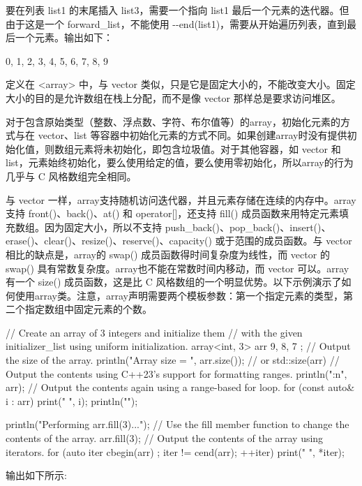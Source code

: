 要在列表 list1 的末尾插入 list3，需要一个指向 list1 最后一个元素的迭代器。但由于这是一个 forward\_list，不能使用 -{}-end(list1)，需要从开始遍历列表，直到最后一个元素。输出如下：

\begin{shell}
0, 1, 2, 3, 4, 5, 6, 7, 8, 9
\end{shell}


定义在 <array> 中，与 vector 类似，只是它是固定大小的，不能改变大小。固定大小的目的是允许数组在栈上分配，而不是像 vector 那样总是要求访问堆区。

对于包含原始类型（整数、浮点数、字符、布尔值等）的array，初始化元素的方式与在 vector、list 等容器中初始化元素的方式不同。如果创建array时没有提供初始化值，则数组元素将未初始化，即包含垃圾值。对于其他容器，如 vector 和 list，元素始终初始化，要么使用给定的值，要么使用零初始化，所以array的行为几乎与 C 风格数组完全相同。

与 vector 一样，array支持随机访问迭代器，并且元素存储在连续的内存中。array支持 front()、back()、at() 和 operator[]，还支持 fill() 成员函数来用特定元素填充数组。因为固定大小，所以不支持 push\_back()、pop\_back()、insert()、erase()、clear()、resize()、reserve()、capacity() 或于范围的成员函数。与 vector 相比的缺点是，array的 swap() 成员函数得时间复杂度为线性，而 vector 的 swap() 具有常数复杂度。array也不能在常数时间内移动，而 vector 可以。array有一个 size() 成员函数，这是比 C 风格数组的一个明显优势。以下示例演示了如何使用array类。注意，array声明需要两个模板参数：第一个指定元素的类型，第二个指定数组中固定元素的个数。

\begin{cpp}
// Create an array of 3 integers and initialize them
// with the given initializer_list using uniform initialization.
array<int, 3> arr { 9, 8, 7 };
// Output the size of the array.
println("Array size = {}", arr.size()); // or std::size(arr)
// Output the contents using C++23's support for formatting ranges.
println("{:n}", arr);
// Output the contents again using a range-based for loop.
for (const auto& i : arr) { print("{} ", i); }
println("");

println("Performing arr.fill(3)...");
// Use the fill member function to change the contents of the array.
arr.fill(3);
// Output the contents of the array using iterators.
for (auto iter { cbegin(arr) }; iter != cend(arr); ++iter) {
    print("{} ", *iter);
}
\end{cpp}

输出如下所示:

